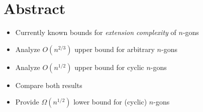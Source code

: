 \section*{Abstract}

\begin{itemize}
  \item Currently known bounds for \emph{extension complexity} of $n$-gons
  \item Analyze $O(n^{2/3})$ upper bound for arbitrary $n$-gons
  \item Analyze $O(n^{1/2})$ upper bound for cyclic $n$-gons
  \item Compare both results
  \item Provide $\Omega(n^{1/2})$ lower bound for (cyclic) $n$-gons
\end{itemize}
